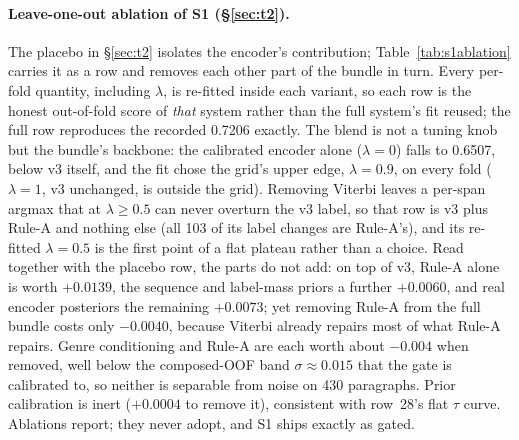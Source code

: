 \documentclass[11pt]{article}
\begin{document}
\paragraph{Leave-one-out ablation of S1 (\S\ref{sec:t2}).} The placebo in
\S\ref{sec:t2} isolates the encoder's contribution;
Table~\ref{tab:s1ablation} carries it as a row and removes each other
part of the bundle in turn. Every per-fold quantity, including $\lambda$, is re-fitted inside
each variant, so each row is the honest out-of-fold score of \emph{that}
system rather than the full system's fit reused; the full row reproduces
the recorded 0.7206 exactly. The blend is not a tuning knob but the
bundle's backbone: the calibrated encoder alone ($\lambda{=}0$) falls to
0.6507, below v3 itself, and the fit chose the grid's upper edge,
$\lambda{=}0.9$, on every fold ($\lambda{=}1$, v3 unchanged, is outside
the grid). Removing Viterbi leaves a per-span argmax that at
$\lambda{\geq}0.5$ can never overturn the v3 label, so that row is v3
plus Rule-A and nothing else (all 103 of its label changes are
Rule-A's), and its re-fitted $\lambda{=}0.5$ is the first point of a
flat plateau rather than a choice. Read together with the placebo row,
the parts do not add: on top of v3, Rule-A alone is worth $+0.0139$,
the sequence and label-mass priors a further $+0.0060$, and real encoder
posteriors the remaining $+0.0073$; yet removing Rule-A from the full bundle costs only
$-0.0040$, because Viterbi already repairs most of what Rule-A repairs.
Genre conditioning and Rule-A are each worth about $-0.004$ when
removed, well below the composed-OOF band $\sigma{\approx}0.015$ that
the gate is calibrated to, so neither is separable from noise on 430
paragraphs. Prior calibration is inert ($+0.0004$ to remove it),
consistent with row~28's flat $\tau$ curve. Ablations report; they never
adopt, and S1 ships exactly as gated.
\end{document}
